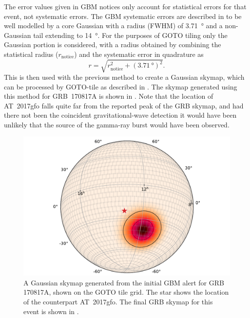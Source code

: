 \begin{colsection}
The error values given in GBM notices only account for statistical errors for that event, not systematic errors. The GBM systematic errors are described in \citet{Fermi_localisation} to be well modelled by a core Gaussian with a radius (FWHM) of \SI{3.71}{\degree} and a non-Gaussian tail extending to \SI{14}{\degree}. For the purposes of GOTO tiling only the Gaussian portion is considered, with a radius obtained by combining the statistical radius ($r_\text{notice}$) and the systematic error in quadrature as
%
\begin{equation}
    r = \sqrt{r_\text{notice}^2 + {(\SI{3.71}{\degree})}^2}.
    \label{eq:fermi_radius}
\end{equation}
%
This is then used with the previous method to create a Gaussian skymap, which can be processed by GOTO-tile as described in . The skymap generated using this method for GRB~170817A is shown in . Note that the location of AT~2017gfo falls quite far from the reported peak of the GRB skymap, and had there not been the coincident gravitational-wave detection it would have been unlikely that the source of the gamma-ray burst would have been observed.

\begin{figure}[t]
    \begin{center}
        \includegraphics[width=\linewidth]{images/tiling/170817_fermi.pdf}
    \end{center}
    \caption[Gaussian skymap for GRB 170817A]{
        A Gaussian skymap generated from the initial GBM alert for GRB 170817A, shown on the GOTO tile grid. The  star shows the location of the counterpart AT~2017gfo. The final GRB skymap for this event is shown in .
    }\label{fig:170817_grb}
\end{figure}


\end{colsection}

